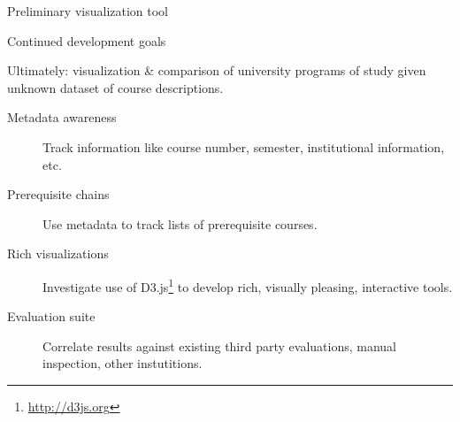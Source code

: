 \documentclass{beamer}
\begin{document}
  \begin{frame}{Preliminary visualization tool}





  \end{frame}

  \begin{frame}{Continued development goals}

    Ultimately: visualization \& comparison of university programs of study
    given unknown dataset of course descriptions.

    \begin{description}
      \item[Metadata awareness] Track information like course number,
      semester, institutional information, etc.
      \item[Prerequisite chains] Use metadata to track lists of
      prerequisite courses.
      \item[Rich visualizations] Investigate use of
      D3.js\footnote{\url{http://d3js.org}} to develop rich, visually
      pleasing, interactive tools.
      \item[Evaluation suite] Correlate results against existing third
      party evaluations, manual inspection, other instutitions.
    \end{description}

  \end{frame}
\end{document}
